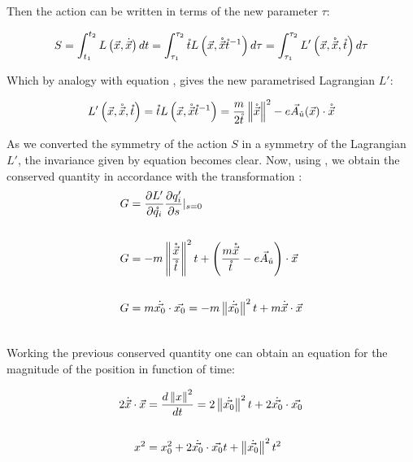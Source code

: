 Then the action can be written in terms of the new parameter $\tau$:

\begin{equation*}
S = \int_{t_1}^{t_2}L\left( \vec{x},\dot{\vec{x}} \right)dt = \int_{\tau_1}^{\tau_2}\mathring{t}L\left( \vec{x},\mathring{\vec{x}}{\mathring{t}}^{-1} \right)d\tau                                                                    = \int_{\tau_1}^{\tau_2}L'\left( \vec{x},\mathring{\vec{x}},\mathring{t} \right)d\tau
\label{eq:action}
\end{equation*}

Which by analogy with equation , gives the new parametrised Lagrangian $L'$:

\begin{equation*}
L'\left( \vec{x},\mathring{\vec{x}},\mathring{t} \right) = \mathring{t}L\left( \vec{x},\mathring{\vec{x}}{\mathring{t}}^{-1} \right) = \frac{m}{2\mathring{t}}\left\lVert \mathring{\vec{x}} \right\rVert^2 - e\vec{A}_{\hat{u}}(\vec{x})\cdot\mathring{\vec{x}}
\end{equation*}

As we converted the symmetry of the action $S$ in a symmetry of the Lagrangian $L'$, the invariance given by  equation  becomes clear. Now, using \cite[Thm (dontforget)]{scheck}, we obtain the conserved quantity in accordance with the transformation : \\

\begin{align*}
\nonumber
G &= \frac{\partial L'}{\partial \mathring{q_i}} \frac{\partial q'_i}{\partial s} \rvert_{s=0}\\ \nonumber
\\ \nonumber
G &= -m\left\lVert \frac{\mathring{\vec{x}}}{\mathring{t}} \right\rVert^2t + \left( \frac{m\mathring{\vec{x}}}{\mathring{t}} - e\vec{A}_{\hat{u}} \right)\cdot \vec{x}\\ \nonumber
\\ \nonumber
G &= m\dot{\vec{x_0}}\cdot\vec{x_0} = -m\left\lVert \dot{\vec{x_0}} \right\rVert^2t + m\dot{\vec{x}}\cdot\vec{x} \\\nonumber
\end{align*}

Working the previous conserved quantity one can obtain an equation for the magnitude of the position in function of time:

\begin{align}
\nonumber
 2\dot{\vec{x}}\cdot\vec{x} &= \frac{d\left\lVert x \right\rVert^2}{dt} = 2\left\lVert \dot{\vec{x_0}} \right\rVert^2t + 2\dot{\vec{x_0}}\cdot\vec{x_0}\\ \nonumber
 \\ 
 x^2 &= x_0^2 +2\dot{\vec{x_0}}\cdot\vec{x_0}t +\left\lVert \dot{\vec{x_0}} \right\rVert^2t^2  
 \label{eq:radius}
\end{align}

